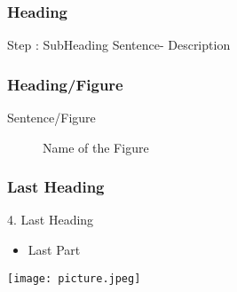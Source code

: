 \documentclass{beamer}
\begin{document}
\begin{frame}
\frametitle{Heading }

\begin{block}{Step : SubHeading}
Sentence- Description
\end{block}
\end{frame}




\begin{frame}
\frametitle{Heading/Figure}
Sentence/Figure
\begin{figure}
  \caption{Name of the Figure }\label{fig:digit}
\end{figure}
\end{frame}


\begin{frame}
\frametitle{Last Heading }

4. Last Heading

\begin{itemize}
\item Last Part
\end{itemize}
\end{frame}


\begin{frame}

\begin{center}
\texttt{[image: picture.jpeg]}

\end{center}

\end{frame}

\end{document}
